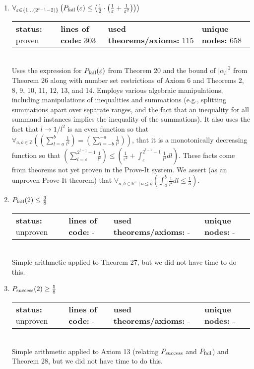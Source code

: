 \documentclass{article}[12pt]
\begin{document}
\begin{enumerate}
\item $\forall_{\varepsilon \in \{1\ldots \left(2^{t - 1} - 2\right)\}} \left(P_{\rm fail}\left(\varepsilon\right) \leq \left(\frac{1}{2} \cdot \left(\frac{1}{\varepsilon} + \frac{1}{\varepsilon^{2}}\right)\right)\right)$ \hfill \\
  \begin{tabular}{l | l | l | l}
    \textbf{status:} proven & \textbf{lines of code:} 303 & \textbf{used theorems/axioms:} 115 & \textbf{unique nodes:} 658
  \end{tabular} \hfill \\
  Uses the expression for $P_{\rm fail}(\varepsilon)$ from Theorem 20 and the bound of $\lvert \alpha_l \rvert^2$ from Theorem 26 along with number set restrictions of Axiom 6 and Theorems 2, 8, 9, 10, 11, 12, 13, and 14.  Employs various algebraic manipulations, including manipulations of inequalities and summations (e.g., splitting summations apart over separate ranges, and the fact that an inequality for all summand instances implies the inequality of the summations).  It also uses the fact that $l \rightarrow 1/l^2$ is an even function so that $\forall_{a, b \in \mathbb{Z}} \left(\left(\sum_{l=a}^{b} \frac{1}{l^{2}}\right) = \left(\sum_{l=-b}^{-a} \frac{1}{l^{2}}\right)\right)$, that it is a monotonically decreasing function so that $\left(\sum_{l=\varepsilon}^{2^{t - 1} - 1} \frac{1}{l^{2}}\right) \leq \left(\frac{1}{\varepsilon^{2}} + \int_{\varepsilon}^{2^{t - 1} - 1}\frac{1}{l^{2}}dl\right)$.  These facts come from theorems not yet proven in the Prove-It system.  We assert (as an unproven Prove-It theorem) that $\forall_{a, b \in \mathbb{R}^+~|~a \leq b} \left(\int_{a}^{b}\frac{1}{l^{2}}dl \leq \frac{1}{a}\right)$.
\item $P_{\rm fail}(2) \leq \frac{3}{8}$ \hfill \\
  \begin{tabular}{l | l | l | l}
    \textbf{status:} unproven & \textbf{lines of code:} - & \textbf{used theorems/axioms:} - & \textbf{unique nodes:} -            
  \end{tabular} \hfill \\
Simple arithmetic applied to Theorem 27, but we did not have time to do this.
\item $P_{\rm success}(2) \geq \frac{5}{8}$ \hfill \\
  \begin{tabular}{l | l | l | l}
    \textbf{status:} unproven & \textbf{lines of code:} - & \textbf{used theorems/axioms:} - & \textbf{unique nodes:} -            
  \end{tabular} \hfill \\
  Simple arithmetic applied to Axiom 13 (relating $P_{\rm success}$ and $P_{\rm fail}$) and Theorem 28, but we did not have time to do this.
\end{enumerate}
\end{document}
